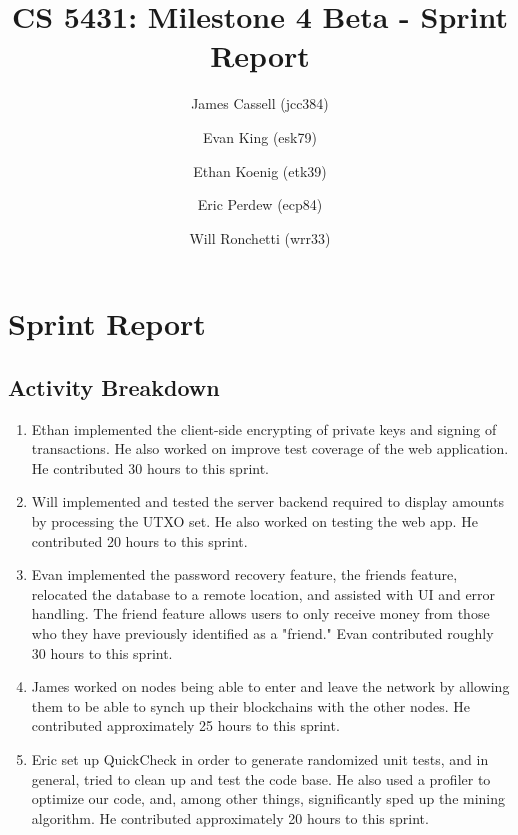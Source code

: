 \documentclass[a4paper,12pt]{article}
\title{CS 5431: Milestone 4 Beta - Sprint Report}
\author{
James Cassell (jcc384)
\and
Evan King (esk79)
\and
Ethan Koenig (etk39)
\and
Eric Perdew (ecp84)
\and
Will Ronchetti (wrr33)
}
\begin{document}
\maketitle

\section{Sprint Report}

\subsection{Activity Breakdown}

\begin{enumerate}
\item Ethan implemented the client-side encrypting of private keys and signing of transactions. He also worked on improve test coverage of the web application. He contributed 30 hours to this sprint.
\item Will implemented and tested the server backend required to display amounts by processing the UTXO set. He also worked on testing the web app. He contributed 20 hours to this sprint. 
\item Evan implemented the password recovery feature, the friends feature, relocated the database to a remote location, and assisted with UI and error handling. The friend feature allows users to only receive money from those who they have previously identified as a "friend." Evan contributed roughly 30 hours to this sprint.
\item James worked on nodes being able to enter and leave the network by allowing them to be able to synch up their blockchains with the other nodes.
He contributed approximately 25 hours to this sprint.
\item  Eric set up QuickCheck in order to generate randomized unit tests, and in general, tried to clean up and test the code base. He also used a profiler to optimize our code, and, among other things, significantly sped up the mining algorithm. He contributed approximately 20 hours to this sprint.
\end{enumerate}
\end{document}
